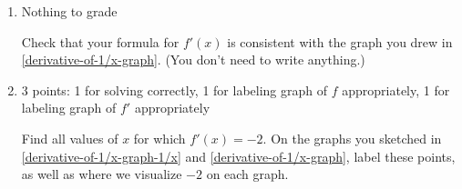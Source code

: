 \documentclass{article}
\providecommand{\check}{}
\renewcommand{\check}{\ifmmode{\text{ \ding{51} }}\else{\ding{51} }\fi}
\begin{document}
\begin{enumerate}
\begin{enumerate}
  \item

    \begin{grading}
      Nothing to grade
    \end{grading}

    \begin{problem}
      \check Check that your formula for $f'(x)$ is consistent with the graph you drew in \ref{derivative-of-1/x-graph}. (You don't need to write anything.)
    \end{problem}

  \item
    \begin{grading} 
      3 points: 1 for solving correctly, 1 for labeling graph of $f$ appropriately, 1 for labeling graph of $f'$ appropriately 
    \end{grading} 

    \begin{problem}[\stretch{0.5}]
      Find all values of $x$ for which $f'(x) = -2$. On the graphs you sketched in \ref{derivative-of-1/x-graph-1/x} and \ref{derivative-of-1/x-graph}, label these points, as well as where we visualize $-2$ on each graph.
    \end{problem}


\end{enumerate}
\end{enumerate}
\end{document}
